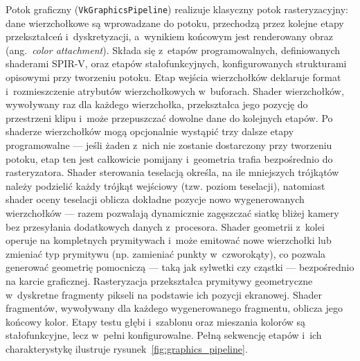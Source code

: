 Potok graficzny (\texttt{VkGraphicsPipeline}) realizuje klasyczny potok rasteryzacyjny:
dane wierzchołkowe są wprowadzane do potoku, przechodzą przez kolejne etapy przekształceń
i~dyskretyzacji, a~wynikiem końcowym jest renderowany obraz (ang.~\textit{color attachment}). Składa się z~etapów
programowalnych, definiowanych shaderami SPIR-V, oraz etapów stałofunkcyjnych,
konfigurowanych strukturami opisowymi przy tworzeniu potoku. Etap wejścia wierzchołków
deklaruje format i~rozmieszczenie atrybutów wierzchołkowych w~buforach. Shader
wierzchołków, wywoływany raz dla każdego wierzchołka, przekształca jego pozycję
do przestrzeni klipu i~może przepuszczać dowolne dane do kolejnych etapów. Po
shaderze wierzchołków mogą opcjonalnie wystąpić trzy dalsze etapy programowalne ---
jeśli żaden z~nich nie zostanie dostarczony przy tworzeniu potoku, etap ten jest
całkowicie pomijany i~geometria trafia bezpośrednio do rasteryzatora.
Shader sterowania teselacją określa, na ile mniejszych trójkątów należy podzielić
każdy trójkąt wejściowy (tzw. poziom teselacji), natomiast shader oceny teselacji
oblicza dokładne pozycje nowo wygenerowanych wierzchołków --- razem pozwalają
dynamicznie zagęszczać siatkę bliżej kamery bez przesyłania dodatkowych danych z~procesora.
Shader geometrii z~kolei operuje na kompletnych prymitywach i~może emitować nowe
wierzchołki lub zmieniać typ prymitywu (np. zamieniać punkty w~czworokąty), co pozwala
generować geometrię pomocniczą --- taką jak sylwetki czy cząstki --- bezpośrednio
na karcie graficznej. Rasteryzacja przekształca prymitywy
geometryczne w~dyskretne fragmenty pikseli na podstawie ich pozycji ekranowej.
Shader fragmentów, wywoływany dla każdego wygenerowanego fragmentu, oblicza jego
końcowy kolor. Etapy testu głębi i~szablonu oraz mieszania kolorów są stałofunkcyjne,
lecz w~pełni konfigurowalne. Pełną sekwencję etapów i~ich charakterystykę ilustruje
rysunek~\ref{fig:graphics_pipeline}.

